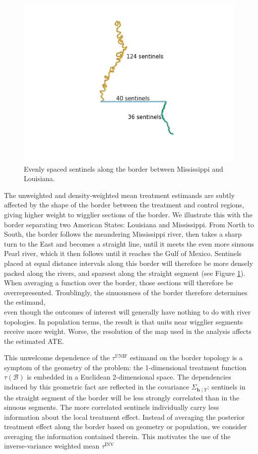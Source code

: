 \documentclass[letter]{article}
\makeatletter
\def\maxwidth{\ifdim\Gin@nat@width>\linewidth\linewidth
\else\Gin@nat@width\fi}
\let\Oldincludegraphics\includegraphics
\renewcommand{\includegraphics}[1]{\Oldincludegraphics[width=1.0\maxwidth]{#1}}
\newcommand{\border}{\mathcal{B}}
\newcommand{\sentinels}{\bm{b}}
\newcommand{\unifavg}{\tau^{\mathrm{UNIF}}}
\newcommand{\invvar}{\tau^{\mathrm{INV}}}
\makeatother
\begin{document}
\begin{figure}
\centering
\includegraphics{../figures/mississippi_counts.png}
\caption{\label{fig:mississippi_counts} Evenly spaced sentinels along the border between Mississippi and Louisiana.}
\end{figure}

The unweighted and density-weighted mean treatment estimands are subtly affected by the shape of the border between the treatment and control regions,
giving higher weight to wigglier sections of the border.
We illustrate this with the border separating two American States: Louisiana and Mississippi.
From North to South, the border follows the meandering Mississippi river, then takes a sharp turn to the East and becomes a straight line, until it meets the even more sinuous Pearl river, which it then follows until it reaches the Gulf of Mexico.
Sentinels placed at equal distance intervals along this border will therefore be more densely packed along the rivers, and sparsest along the straight segment (see Figure \ref{fig:mississippi_counts}).
When averaging a function over the border, those sections will therefore be overrepresented.
Troublingly, the sinuousness of the border therefore determines the estimand,\\
even though the outcomes of interest will generally have nothing to do with river topologies.
In population terms, the result is that units near wigglier segments receive more weight.
Worse, the resolution of the map used in the analysis affects the estimated ATE.

This unwelcome dependence of the \(\unifavg\) estimand on the border topology is a symptom of the geometry of the problem: the 1-dimensional treatment function \(\tau(\border)\) is embedded in a Euclidean 2-dimensional space.
The dependencies induced by this geometric fact are reflected in the covariance \(\Sigma_{\sentinels \mid Y}\): sentinels in the straight segment of the border will be less strongly correlated than in the sinuous segments.
The more correlated sentinels individually carry less information about the local treatment effect.
Instead of averaging the posterior treatment effect along the border based on geometry or population, we consider averaging the information contained therein.
This motivates the use of the inverse-variance weighted mean \(\invvar\)
\end{document}
